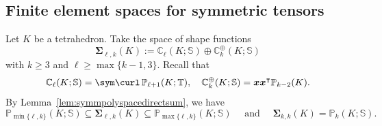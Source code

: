 \subsection{Finite element spaces for symmetric tensors}
Let $K$ be a tetrahedron. %
Take the space of shape functions
\[
\boldsymbol \Sigma_{\ell,k}(K):= \mathbb C_{\ell}(K;\mathbb S)\oplus\mathbb C_k^{\oplus}(K;\mathbb S)
\]
with $k\geq 3$ and $\ell\geq \max\{k-1, 3\}$. Recall that 
\[
\mathbb C_{\ell}(K; \mathbb S)=\sym \curl \, \mathbb  P_{\ell +1}(K; \mathbb T),\quad \mathbb C_k^{\oplus}(K; \mathbb S)=\boldsymbol  x\boldsymbol  x^{\intercal}\mathbb P_{k-2}(K).
\]
 By Lemma~\ref{lem:symmpolyspacedirectsum}, we have
\[
\mathbb P_{\min\{\ell,k\}}(K;\mathbb S)\subseteq\boldsymbol \Sigma_{\ell,k}(K) \subseteq \mathbb P_{\max\{\ell,k\}}(K;\mathbb S) \quad\textrm{ and }\quad \boldsymbol \Sigma_{k,k}(K)=\mathbb P_k(K;\mathbb S).
\]
